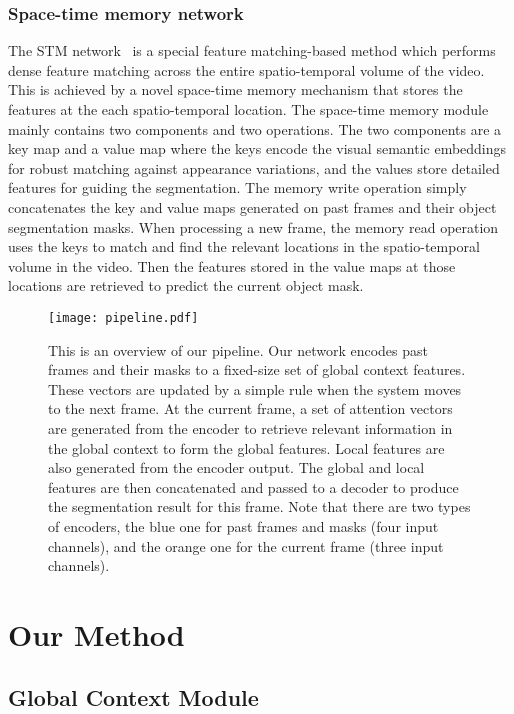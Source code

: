 \documentclass[runningheads]{llncs}
\begin{document}
\subsubsection{Space-time memory network}
The STM network~\cite{stm} is a special feature matching-based method which performs dense feature matching across the entire spatio-temporal volume of the video. This is achieved by a novel space-time memory mechanism that stores the features at the each spatio-temporal location. The space-time memory module mainly contains two components and two operations. The two components are a key map and a value map where the keys encode the visual semantic embeddings for robust matching against appearance variations, and the values store detailed features for guiding the segmentation. The memory write operation simply concatenates the key and value maps generated on past frames and their object segmentation masks. When processing a new frame, the memory read operation uses the keys to match and find the relevant locations in the spatio-temporal volume in the video. Then the features stored in the value maps at those locations are retrieved to predict the current object mask.

\begin{figure*}[tb]
    \texttt{[image: pipeline.pdf]}
    \caption{This is an overview of our pipeline. Our network encodes past frames and their masks to a fixed-size set of global context features. These vectors are updated by a simple rule when the system moves to the next frame. At the current frame, a set of attention vectors are generated from the encoder to retrieve relevant information in the global context to form the global features. Local features are also generated from the encoder output. The global and local features are then concatenated and passed to a decoder to produce the segmentation result for this frame. Note that there are two types of encoders, the blue one for past frames and masks (four input channels), and the orange one for the current frame (three input channels).}
    \label{fig:pipeline}
\end{figure*}

\section{Our Method}
\label{sec:method}
\subsection{Global Context Module}
\end{document}
